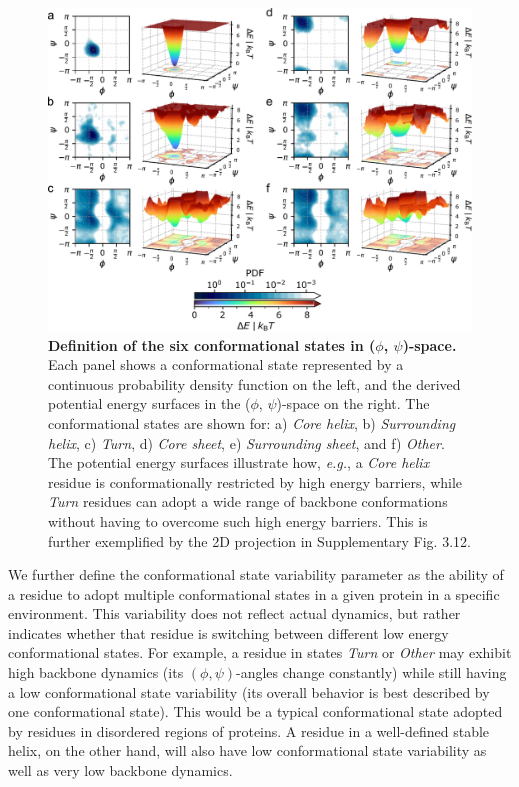 \begin{figure}[tbh!]
    \centering
    \includegraphics[width=\textwidth]{constava/figures_constava/figure2.pdf}
    \caption{
        \textbf{Definition of the six conformational states in ($\phi$, $\psi$)-space.} Each panel shows a conformational state represented by a continuous probability density function on the left, and the derived  potential energy surfaces in the ($\phi$, $\psi$)-space on the right. The conformational states are shown for: 
        a) \textit{Core helix}, 
        b) \textit{Surrounding helix}, 
        c) \textit{Turn}, 
        d) \textit{Core sheet}, 
        e) \textit{Surrounding sheet}, and 
        f) \textit{Other}.
        The potential energy surfaces illustrate how, \textit{e.g.}, a \textit{Core helix} residue is conformationally restricted by high energy barriers, while \textit{Turn} residues can adopt a wide range of backbone conformations without having to overcome such high energy barriers. This is further exemplified by the 2D projection in Supplementary Fig. 3.12.
    }
    \label{fig:kernels_energy}
\end{figure}


We further define the conformational state variability parameter as the ability of a residue to adopt multiple conformational states in a given protein in a specific environment. This variability does not reflect actual dynamics, but rather indicates whether that residue is switching between different low energy conformational states. For example, a residue in states \textit{Turn} or \textit{Other} may exhibit high backbone dynamics (its $(\phi, \psi)$-angles change constantly) while still having a low conformational state variability (its overall behavior is best described by one conformational state). This would be a typical conformational state adopted by residues in disordered regions of proteins. A residue in a well-defined stable helix, on the other hand, will also have low conformational state variability as well as very low backbone dynamics.

